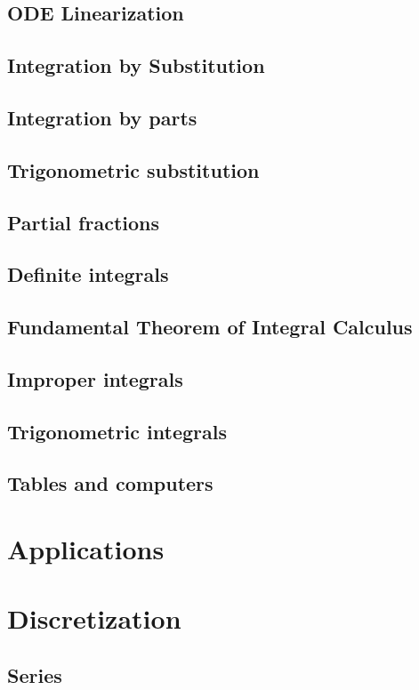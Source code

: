 \documentclass[a4paper]{book}
\begin{document}
\begin{sloppypar}
\section{ODE Linearization} \label{ChIntegrationSecODELinearization}
\section{Integration by Substitution} \label{ChIntegrationSecIntegrationBySubstitution}
\section{Integration by parts} \label{ChIntegrationSecIntegrationByParts}
\section{Trigonometric substitution} \label{ChIntegrationSecTrigonometricSubstitution}
\section{Partial fractions} \label{ChIntegrationSecPartialFractions}
\section{Definite integrals} \label{ChIntegrationSecDefiniteIntegrals}
\section{Fundamental Theorem of Integral Calculus} \label{ChIntegrationSecFundamentalTheoremOfIntegralCalculus}
\section{Improper integrals} \label{ChIntegrationSecImproperIntegrals}
\section{Trigonometric integrals} \label{ChIntegrationSecTrigonometricIntegrals}
\section{Tables and computers} \label{ChIntegrationSecTablesAndComputers}

\chapter{Applications} \label{ChApplications}

\chapter{Discretization} \label{ChDiscretization}
\section{Series} \label{ChDiscretizationSecSeries}

\end{sloppypar}
\end{document}
